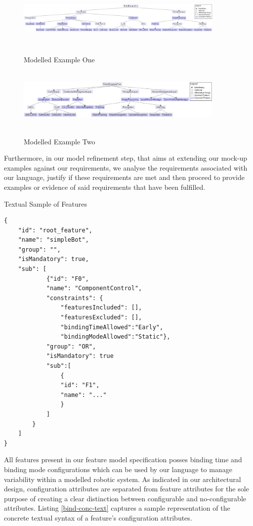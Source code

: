 \documentclass[conference]{IEEEtran}
\begin{document}
\begin{figure}[h]
\caption{Modelled Example One}
\centering
\includegraphics[width=0.9\textwidth,height=3cm]{diagrams/ex1.png}
\label{ex1}
\end{figure}

\begin{figure}[h]
\caption{Modelled Example Two}
\centering
\includegraphics[width=0.9\textwidth,height=3cm]{diagrams/ex2.png}
\label{ex2}
\end{figure}
    
Furthermore, in our model refinement step, that aims at extending our mock-up examples against our requirements, we analyse the requirements associated with our language, justify if these requirements are met and then proceed to provide examples or evidence of said requirements that have been fulfilled.

\begin{listing}[H]
\caption{Textual Sample of Features}
\begin{verbatim}
{
    "id": "root_feature",
    "name": "simpleBot",
    "group": "",
    "isMandatory": true,
    "sub": [
	        {"id": "F0",
	        "name": "ComponentControl",
	        "constraints": {
		        "featuresIncluded": [],
		        "featuresExcluded": [],
		        "bindingTimeAllowed":"Early",
		        "bindingModeAllowed":"Static"},
	        "group": "OR",
	        "isMandatory": true
	        "sub":[
	            {
	            "id": "F1",
	            "name": "..."
	            }
	        ]
        }
    ]
}
\end{verbatim}
\label{feat-conc-text}
\end{listing}

All features present in our feature model specification posses binding time and binding mode configurations which can be used by our language to manage variability within a modelled robotic system. As indicated in our architectural design, configuration attributes are separated from feature attributes for the sole purpose of creating a clear distinction between configurable and no-configurable attributes. Listing
\ref{bind-conc-text} captures a sample representation of the concrete textual syntax of a feature's configuration attributes.
\end{document}
